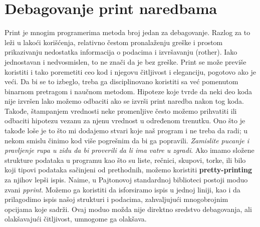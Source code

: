 \documentclass[a4paper]{article}
\begin{document}
\section{Debagovanje print naredbama}
Print je mnogim programerima metoda broj jedan za debagovanje. Razlog za to leži u lakoći korišćenja, relativno čestom pronalaženju greške i prostom prikazivanju nedostatka informacija o podacima i izvršavanju (rother). Iako jednostavan i nedvosmislen, to ne znači da je bez greške. Print se može previše koristiti i tako poremetiti ceo kod i njegovu čitljivost i eleganciju, pogotovo ako je veći. Da bi  se to izbeglo, treba ga disciplinovano koristiti sa već pomenutom binarnom pretragom i naučnom metodom.
Hipoteze koje tvrde da neki deo koda nije izvršen lako možemo odbaciti ako se izvrši print naredba nakon tog koda. Takođe, štampanjem vrednosti neke promenljive često možemo prihvatiti ili odbaciti hipotezu vezanu za njenu vrednost u određenom trenutku. 
Ono što je takođe loše je to što mi dodajemo stvari koje naš program i ne treba da radi; u nekom smislu činimo kod više pogrešnim da bi ga popravili. \emph{Zamislite pucanje i pravljenje rupa u zidu da bi proverili da li ima vatre u zgradi}\cite{excDocPyt}. 
Ako imamo složene strukture podataka u programu kao što su liste, rečnici, skupovi, torke, ili bilo koji tipovi podataka sačinjeni od prethodnih, možemo koristiti \textbf{pretty-printing} za njihov lepši ispis. Naime, u Pajtonovoj standardnoj biblioteci postoji moduo zvani \emph{pprint}\cite{ppDocPyt}. Možemo ga koristiti da isforsiramo ispis u jednoj liniji, kao i da prilagodimo ispis našoj strukturi i podacima, zahvaljujući mnogobrojnim opcijama koje sadrži. Ovaj moduo možda nije direktno sredstvo debagovanja, ali olakšavajući čitljivost, umnogome ga olakšava. 
\end{document}
